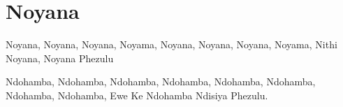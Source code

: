 \starttocol
\chapter{Noyana}
\nexttocol
\hfill{\it }
\stoptocol
\starttocol
\startlines
{\sc Noyana}, Noyana, Noyana, Noyama,
Noyana, Noyana, Noyana, Noyama,
Nithi Noyana, 
Noyana Phezulu
 
Ndohamba, Ndohamba, Ndohamba, 
\hfill Ndohamba,
Ndohamba, Ndohamba, Ndohamba, 
\hfill Ndohamba,
Ewe Ke Ndohamba
Ndisiya Phezulu.
\stoplines
\nexttocol

\stoptocol
